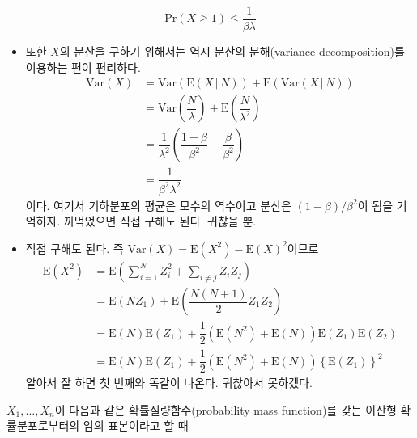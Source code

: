 \documentclass[answers]{exam}
\begin{document}
\begin{questions}
\begin{solution}
\begin{enumerate}[(a)]
        \begin{equation}
          \mathrm{Pr}\left(X\geq 1\right) \leq \dfrac{1}{\beta\lambda}
        \end{equation}
        \begin{itemize}
          \item 또한 $X$의 분산을 구하기 위해서는 역시 분산의 분해(variance decomposition)를 이용하는 편이 편리하다.
          \begin{align}
            \mathrm{Var}\left(X\right)&= \mathrm{Var}\left(\mathrm{E}\left(X\,|\,N\right)\right)+\mathrm{E}\left(\mathrm{Var}\left(X\,|\,N\right)\right)\\
            &=\mathrm{Var}\left(\dfrac{N}{\lambda}\right)+\mathrm{E}\left(\dfrac{N}{\lambda^{2}}\right)\\
            &=\dfrac{1}{\lambda^{2}}\left(\dfrac{1-\beta}{\beta^{2}}+\dfrac{\beta}{\beta^{2}} \right)\\
            &=\dfrac{1}{\beta^{2}\lambda^{2}}
          \end{align}
          이다. 여기서 기하분포의 평균은 모수의 역수이고 분산은 $\left(1-\beta\right)/\beta^{2}$이 됨을 기억하자. 까먹었으면 직접 구해도 된다. 귀찮을 뿐.
          \item 직접 구해도 된다. 즉 $\mathrm{Var}\left(X\right)=\mathrm{E}\left(X^{2}\right)-\mathrm{E}\left(X\right)^{2}$이므로
          \begin{align}
            \mathrm{E}\left(X^{2}\right) &= \mathrm{E}\left(\sum_{i=1}^{N}Z_{i}^{2}+\sum_{i\neq j}Z_{i}Z_{j} \right)\\
            &=\mathrm{E}\left(NZ_{1}\right)+\mathrm{E}\left(\dfrac{N\left(N+1\right)}{2}Z_{1}Z_{2} \right)\\
            &= \mathrm{E}\left(N\right)\mathrm{E}\left(Z_{1}\right)+\dfrac{1}{2}\left(\mathrm{E}\left(N^{2}\right)+\mathrm{E}\left(N\right)\right)\mathrm{E}\left(Z_{1}\right)\mathrm{E}\left(Z_{2}\right)\\
            &=\mathrm{E}\left(N\right)\mathrm{E}\left(Z_{1}\right)+\dfrac{1}{2}\left(\mathrm{E}\left(N^{2}\right)+\mathrm{E}\left(N\right)\right)\left\{\mathrm{E}\left(Z_{1}\right)\right\}^{2}
          \end{align}
          알아서 잘 하면 첫 번째와 똑같이 나온다. 귀찮아서 못하겠다.
        \end{itemize}
      \end{enumerate}
    \end{solution}
    \question
    $X_{1},\ldots,X_{n}$이 다음과 같은 확률질량함수(probability mass function)를 갖는 이산형 확률분포로부터의 임의 표본이라고 할 때

\end{questions}
\end{document}
